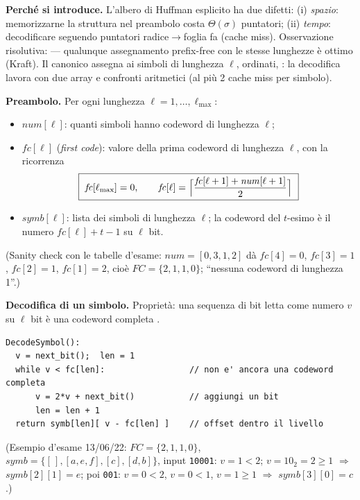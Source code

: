 \textbf{Perch\'e si introduce.} L'albero di Huffman esplicito ha due difetti:
(i) \emph{spazio}: memorizzarne la struttura nel preambolo costa $\Theta(\sigma)$ puntatori;
(ii) \emph{tempo}: decodificare seguendo puntatori radice$\to$foglia fa  (cache miss). Osservazione risolutiva:  --- qualunque assegnamento prefix-free con le stesse lunghezze \`e ottimo (Kraft). Il
canonico assegna ai simboli di lunghezza $\ell$, ordinati, : la
decodifica lavora con due array e confronti aritmetici (al pi\`u 2 cache miss per simbolo).

\textbf{Preambolo.} Per ogni lunghezza $\ell=1,\dots,\ell_{\max}$:
\begin{itemize}[leftmargin=1.6em,itemsep=1pt]
\item $\mathit{num}[\ell]$: quanti simboli hanno codeword di lunghezza $\ell$;
\item $\mathit{fc}[\ell]$ (\emph{first code}): valore della prima codeword di lunghezza $\ell$,
con la ricorrenza 
\[
\boxed{\ \mathit{fc}[\ell_{\max}]=0,\qquad
\mathit{fc}[\ell]=\Bigl\lceil\frac{\mathit{fc}[\ell+1]+\mathit{num}[\ell+1]}{2}\Bigr\rceil\ }
\]
\item $\mathit{symb}[\ell]$: lista dei simboli di lunghezza $\ell$; la codeword del $t$-esimo \`e
il numero $\mathit{fc}[\ell]+t-1$ su $\ell$ bit.
\end{itemize}
(Sanity check con le tabelle d'esame: $\mathit{num}=[0,3,1,2]$ d\`a $\mathit{fc}[4]=0$,
$\mathit{fc}[3]=1$, $\mathit{fc}[2]=1$, $\mathit{fc}[1]=2$, cio\`e $FC=\{2,1,1,0\}$;
 ``nessuna codeword di
lunghezza 1''.)

\textbf{Decodifica di un simbolo.} Propriet\`a: una sequenza di bit letta come numero $v$ su
$\ell$ bit \`e una codeword completa .
\begin{verbatim}
DecodeSymbol():
  v = next_bit();  len = 1
  while v < fc[len]:                 // non e' ancora una codeword completa
      v = 2*v + next_bit()           // aggiungi un bit
      len = len + 1
  return symb[len][ v - fc[len] ]    // offset dentro il livello
\end{verbatim}
(Esempio d'esame 13/06/22: $FC=\{2,1,1,0\}$, $\mathit{symb}=\{[\,],[a,e,f],[c],[d,b]\}$, input
\texttt{10001}: $v=1<2$; $v=10_2=2\ge1$ $\Rightarrow$ $symb[2][1]=e$; poi \texttt{001}: $v=0<2$,
$v=0<1$, $v=1\ge1$ $\Rightarrow$ $symb[3][0]=c$.)


